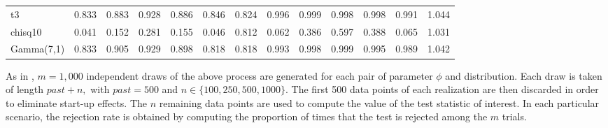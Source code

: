 \begin{table}[!h]
{\begin{tabular}[t]{lrrrrrrrrrrrr}
\hspace{1em}t3 & 0.833 & 0.883 & 0.928 & 0.886 & 0.846 & 0.824 & 0.996 & 0.999 & 0.998 & 0.998 & 0.991 & 1.044\\
\hspace{1em}chisq10 & 0.041 & 0.152 & 0.281 & 0.155 & 0.046 & 0.812 & 0.062 & 0.386 & 0.597 & 0.388 & 0.065 & 1.031\\
\hspace{1em}Gamma(7,1) & 0.833 & 0.905 & 0.929 & 0.898 & 0.818 & 0.818 & 0.993 & 0.998 & 0.999 & 0.995 & 0.989 & 1.042\\
\bottomrule
\end{tabular}}
\end{table}

As in \citet{vavra2017}, \(m=1,000\) independent draws of the above process are generated for each pair of parameter \(\phi\) and distribution. Each draw is taken of length \(past+n,\) with \(past=500\) and \(n \in \{100,250,500,1000 \}\). The first 500 data points of each realization are then discarded in order to eliminate start-up effects. The \(n\) remaining data points are used to compute the value of the test statistic of interest. In each particular scenario, the rejection rate is obtained by computing the proportion of times that the test is rejected among the \(m\) trials.

